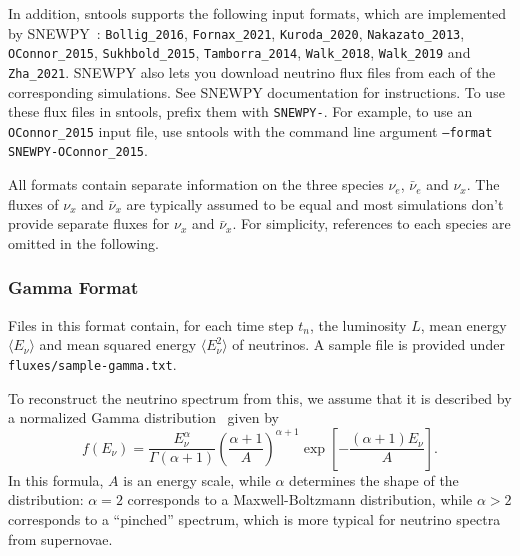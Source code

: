 \documentclass[11pt, oneside]{article}
\newcommand{\mean}[1]{\ensuremath{\langle #1 \rangle}}
\newcommand{\nue}{\ensuremath{\nu_e}\xspace}
\newcommand{\nux}{\ensuremath{\nu_x}\xspace}
\newcommand{\nuebar}{\ensuremath{\bar{\nu}_e}\xspace}
\newcommand{\nuxbar}{\ensuremath{\bar{\nu}_x}\xspace}
\begin{document}
In addition, sntools supports the following input formats, which are implemented by SNEWPY~\cite{Baxter2021,SNEWS:2021ezc}:
\texttt{Bollig\_2016},
\texttt{Fornax\_2021},
\texttt{Kuroda\_2020},
\texttt{Nakazato\_2013},
\texttt{OConnor\_2015},
\texttt{Sukhbold\_2015},
\texttt{Tamborra\_2014},
\texttt{Walk\_2018},
\texttt{Walk\_2019} and
\texttt{Zha\_2021}.
SNEWPY also lets you download neutrino flux files from each of the corresponding simulations. See SNEWPY documentation for instructions.
To use these flux files in sntools, prefix them with \texttt{SNEWPY-}. For example, to use an \texttt{OConnor\_2015} input file, use sntools with the command line argument \texttt{--format SNEWPY-OConnor\_2015}.


All formats contain separate information on the three species \nue, \nuebar and \nux.
The fluxes of \nux and \nuxbar are typically assumed to be equal and most simulations don’t provide separate fluxes for \nux and \nuxbar.
For simplicity, references to each species are omitted in the following.

\subsubsection{Gamma Format}\label{sec:format-gamma}
Files in this format contain, for each time step $t_n$, the luminosity $L$, mean energy $\mean{E_\nu}$ and mean squared energy $\mean{E_\nu^2}$ of neutrinos.
A sample file is provided under \texttt{fluxes/sample-gamma.txt}.
%

To reconstruct the neutrino spectrum from this, we assume that it is described by a normalized Gamma distribution~\cite{Keil2003,Tamborra2012} given by
\begin{equation}
f (E_\nu) = \frac{E_\nu^\alpha}{\Gamma (\alpha + 1)} \left( \frac{\alpha + 1}{A} \right)^{\alpha + 1} \exp \left[ - \frac{(\alpha + 1) E_\nu}{A} \right].
\end{equation}
In this formula, $A$ is an energy scale, while $\alpha$ determines the shape of the distribution: $\alpha = 2$ corresponds to a Maxwell-Boltzmann distribution, while $\alpha > 2$ corresponds to a “pinched” spectrum, which is more typical for neutrino spectra from supernovae.
\end{document}
